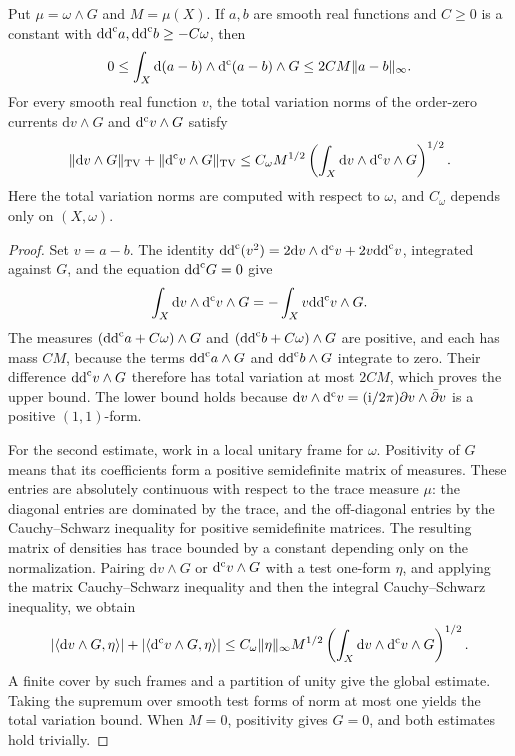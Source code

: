 \begin{lemma}\label{lem:pluriharmonic-gradient-energy}
Put $\mu=\omega\wedge G$ and $M=\mu(X)$. If $a,b$ are smooth real functions and $C\geq0$ is a constant with $\mathrm{dd}^{\mathrm{c}} a,\mathrm{dd}^{\mathrm{c}} b\geq-C\omega$, then
\[
 0\leq\int_X\mathrm{d}(a-b)\wedge\mathrm d^{\mathrm c}(a-b)\wedge G
 \leq2C M\|a-b\|_\infty.
\]
For every smooth real function $v$, the total variation norms of the order-zero currents $\mathrm{d}v\wedge G$ and $\mathrm d^{\mathrm c} v\wedge G$ satisfy
\[
 \|\mathrm{d}v\wedge G\|_{\mathrm{TV}}+
 \|\mathrm d^{\mathrm c} v\wedge G\|_{\mathrm{TV}}
 \leq C_\omega M^{1/2}
       \left(\int_X\mathrm{d}v\wedge\mathrm d^{\mathrm c} v\wedge G\right)^{1/2}.
\]
Here the total variation norms are computed with respect to $\omega$, and $C_\omega$ depends only on $(X,\omega)$.
\end{lemma}
\begin{proof}
Set $v=a-b$. The identity $\mathrm{dd}^{\mathrm{c}}(v^2)=2\mathrm{d}v\wedge\mathrm d^{\mathrm c} v+2v\mathrm{dd}^{\mathrm{c}} v$, integrated against $G$, and the equation $\mathrm{dd}^{\mathrm{c}} G=0$ give
\[
 \int_X\mathrm{d}v\wedge\mathrm d^{\mathrm c} v\wedge G
 =-\int_Xv\mathrm{dd}^{\mathrm{c}} v\wedge G.
\]
The measures $(\mathrm{dd}^{\mathrm{c}} a+C\omega)\wedge G$ and $(\mathrm{dd}^{\mathrm{c}} b+C\omega)\wedge G$ are positive, and each has mass $CM$, because the terms $\mathrm{dd}^{\mathrm{c}} a\wedge G$ and $\mathrm{dd}^{\mathrm{c}} b\wedge G$ integrate to zero. Their difference $\mathrm{dd}^{\mathrm{c}} v\wedge G$ therefore has total variation at most $2CM$, which proves the upper bound. The lower bound holds because $\mathrm{d}v\wedge\mathrm d^{\mathrm c} v=(\mathrm{i}/2\pi)\partial v\wedge\bar\partial v$ is a positive $(1,1)$-form.

For the second estimate, work in a local unitary frame for $\omega$. Positivity of $G$ means that its coefficients form a positive semidefinite matrix of measures. These entries are absolutely continuous with respect to the trace measure $\mu$: the diagonal entries are dominated by the trace, and the off-diagonal entries by the Cauchy--Schwarz inequality for positive semidefinite matrices. The resulting matrix of densities has trace bounded by a constant depending only on the normalization. Pairing $\mathrm{d}v\wedge G$ or $\mathrm d^{\mathrm c} v\wedge G$ with a test one-form $\eta$, and applying the matrix Cauchy--Schwarz inequality and then the integral Cauchy--Schwarz inequality, we obtain
\[
 |\langle\mathrm{d}v\wedge G,\eta\rangle|
 +|\langle\mathrm d^{\mathrm c} v\wedge G,\eta\rangle|
 \leq C_\omega\|\eta\|_\infty M^{1/2}
 \left(\int_X\mathrm{d}v\wedge\mathrm d^{\mathrm c} v\wedge G\right)^{1/2}.
\]
A finite cover by such frames and a partition of unity give the global estimate. Taking the supremum over smooth test forms of norm at most one yields the total variation bound. When $M=0$, positivity gives $G=0$, and both estimates hold trivially.
\end{proof}

